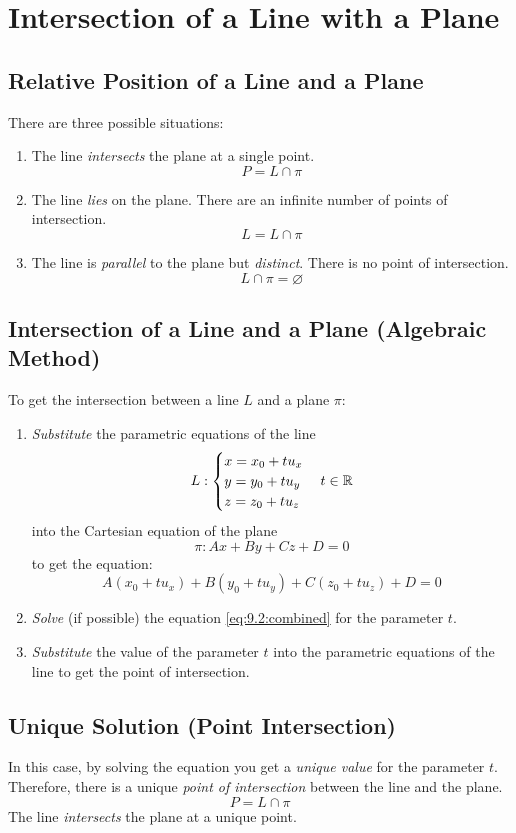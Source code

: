 \section{Intersection of a Line with a Plane}
\subsection{Relative Position of a Line and a Plane}
	There are three possible situations:
	\begin{enumerate}
		\item The line \emph{intersects} the plane at a single point. \[P = L \cap \pi\]
		\item The line \emph{lies} on the plane. There are an infinite number of points of intersection. \[L = L \cap \pi\]
		\item The line is \emph{parallel} to the plane but \emph{distinct}. There is no point of intersection. \[L \cap \pi = \varnothing\]
	\end{enumerate}
\subsection{Intersection of a Line and a Plane (Algebraic Method)}
	To get the intersection between a line $L$ and a plane $\pi$:
	\begin{enumerate}
		\item \emph{Substitute} the parametric equations of the line
			\begin{equation*}
				L:
				\begin{cases}
					x = x_0 + tu_x\\
					y = y_0 + tu_y\\
					z = z_0 + tu_z
				\end{cases}
				t \in \mathbb{R}
			\end{equation*}
			into the Cartesian equation of the plane
			\[\pi: Ax + By + Cz + D = 0\]
			to get the equation:
			\begin{equation}\label{eq:9.2:combined}
				A(x_0 + tu_x) + B(y_0 + tu_y) + C(z_0 + tu_z) + D = 0
			\end{equation}
		\item \emph{Solve} (if possible) the equation \eqref{eq:9.2:combined} for the parameter $t$.
		\item \emph{Substitute} the value of the parameter $t$ into the parametric equations of the line to get the point of intersection.
	\end{enumerate}
\subsection{Unique Solution (Point Intersection)}
	In this case, by solving the equation you get a \emph{unique value} for the parameter $t$.
	Therefore, there is a unique \emph{point of intersection} between the line and the plane.
	\[P = L \cap \pi\]
	The line \emph{intersects} the plane at a unique point.
